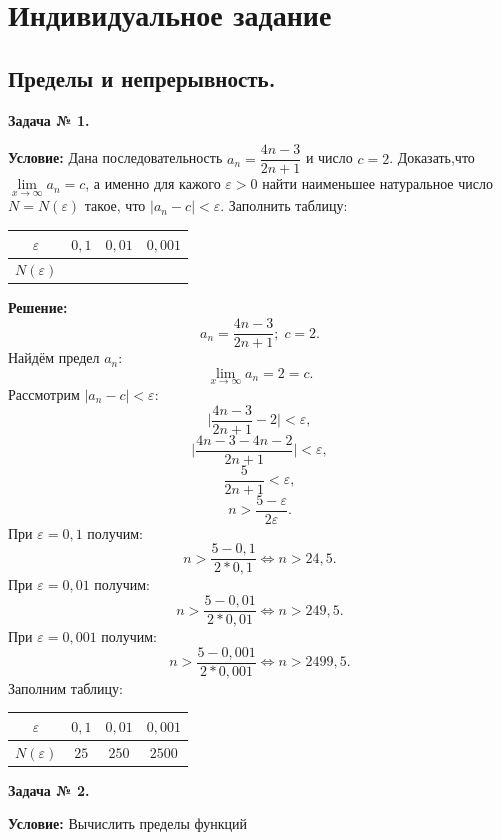 \documentclass[12pt]{article}
\newcommand{\eps}{\varepsilon}
\begin{document}
\section{Индивидуальное задание}
\subsection{Пределы и непрерывность.}
\begin{center}
\textbf{Задача № 1.}   
\end{center}
\textbf{Условие:}
Дана последовательность  $a_{n}=\dfrac{4n-3}{2n+1}$ и число $c=2$. Доказать,что $\lim\limits_{x\rightarrow\infty} a_{n}=c$, а именно для кажого $\eps > 0$ найти наименьшее натуральное число $N = N(\eps)$ такое, что $|a_{n}-c|<\eps$. Заполнить таблицу:
\begin{table}[h]
    \centering
    \begin{tabular}{|c|c|c|c|}
        \hline
         $\eps$ & $0,1$ & $0,01$ & $0,001$ \\
         \hline
         $N(\eps)$ &  &  & \\
         \hline
    \end{tabular}
\end{table}
\textbf{Решение:}
$$a_{n}=\dfrac{4n-3}{2n+1}; \; c = 2.$$ 
Найдём предел $a_{n}$:
$$\lim\limits_{x\rightarrow\infty} a_{n}= 2 = c.$$
Рассмотрим  $|a_{n}-c|<\eps$:
$$\biggl |\dfrac{4n-3}{2n+1} - 2  \biggr |<\eps,$$
$$\biggl |\dfrac{4n-3-4n-2}{2n+1} \biggr | <\eps,$$
$$\dfrac{5}{2n+1} < \eps,$$
$$n > \dfrac{5-\eps}{2\eps}.$$
При $\eps = 0,1$ получим:
$$ n > \dfrac{5-0,1}{2*0,1} \Leftrightarrow n > 24,5.$$
При $\eps = 0,01$ получим:
$$ n > \dfrac{5-0,01}{2*0,01} \Leftrightarrow n > 249,5.$$
При $\eps = 0,001$ получим:
$$ n > \dfrac{5-0,001}{2*0,001} \Leftrightarrow n > 2499,5.$$
Заполним таблицу:
\begin{table}[h]
    \centering
    \begin{tabular}{|c|c|c|c|}
        \hline
         $\eps$ & $0,1$ & $0,01$ & $0,001$ \\
         \hline
         $N(\eps)$ & $25$ & $250$  & $2500$ \\
         \hline
    \end{tabular}
\end{table}
\newpage
\begin{center}
\textbf{Задача № 2.}   
\end{center}
\textbf{Условие:}
Вычислить пределы функций
\end{document}
